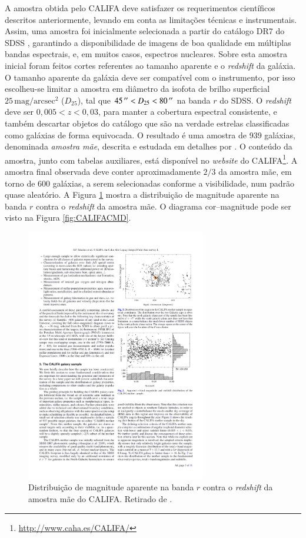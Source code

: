 A amostra obtida pelo CALIFA deve satisfazer os requerimentos científicos
descritos anteriormente, levando em conta as limitações técnicas e
instrumentais. Assim, uma amostra foi inicialmente selecionada a partir do
catálogo DR7 do SDSS \citep{Abazajian2009}, garantindo a disponibilidade de
imagens de boa qualidade em múltiplas bandas espectrais, e, em muitos casos,
espectros nucleares. Sobre esta amostra inicial foram feitos cortes referentes
ao tamanho aparente e o {\em redshift} da galáxia. O tamanho aparente da galáxia
deve ser compatível com o instrumento, por isso escolheu-se limitar a amostra em
diâmetro da isofota de brilho superficial $25\,\mathrm{mag}/\mathrm{arcsec}^2$
($D_{25}$), tal que $45\,^{\prime\prime} < D_{25} < 80\,^{\prime\prime}$ na banda $r$ do SDSS. O
{\em redshift} deve ser $0,005 < z < 0,03$, para manter a cobertura espectral
consistente, e também descartar objetos do catálogo que são na verdade estrelas
classificadas como galáxias de forma equivocada.
O resultado é uma amostra de 939 galáxias, denominada {\em amostra mãe},
descrita e estudada em detalhes por \citet{Walcher2014}. O conteúdo da amostra,
junto com tabelas auxiliares, está disponível no {\em website} do
CALIFA\footnote{\url{http://www.caha.es/CALIFA/}}. A amostra final observada
deve conter aproximadamente $2/3$ da amostra mãe, em torno de 600 galáxias, a
serem selecionadas conforme a visibilidade, num padrão quase aleatório. A Figura
\ref{fig:CALIFASample} mostra a distribuição de magnitude aparente na banda $r$
contra o {\em redshift} da amostra mãe. O diagrama cor--magnitude pode ser visto
na Figura \ref{fig:CALIFACMD}.

\begin{figure}
	\includegraphics[width=0.7\textwidth]{figuras/CALIFASample}
	\caption[Distribuição de magnitude $r$ contra {\em redshift} da amostra mãe
	do CALIFA] {Distribuição de magnitude aparente na banda $r$ contra o {\em
	redshift} da amostra mãe do CALIFA. Retirado de \citet{Sanchez2012}.}
	\label{fig:CALIFASample}
\end{figure}

